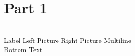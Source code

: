 \documentclass{ec112}
\begin{document}
\maketitle
\pagebreak

\section*{Part 1}\quad\\
\hwtable
  {Label}
  {Left Picture}
  {Right Picture}
  {Multiline\\
   Bottom Text}
\end{document}
